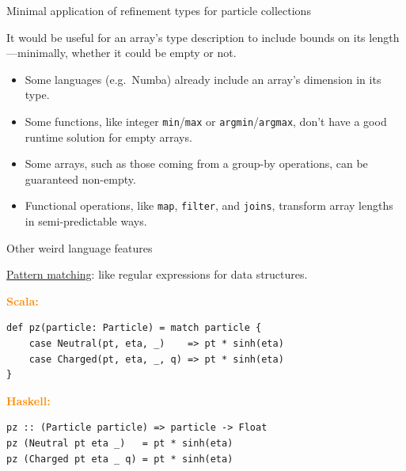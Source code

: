 \documentclass[aspectratio=169]{beamer}
\begin{document}
\begin{frame}{Minimal application of refinement types for particle collections}
\Large
\vspace{0.25 cm}
\begin{center}
It would be useful for an array's type description to include bounds on its length---minimally, whether it could be empty or not.

\large
\vspace{0.5 cm}
\begin{minipage}{0.85\linewidth}
\begin{itemize}
\item Some languages (e.g.\ Numba) already include an array's dimension in its type.
\item Some functions, like integer {\tt min}/{\tt max} or {\tt argmin}/{\tt argmax}, don't have a good runtime solution for empty arrays.
\item Some arrays, such as those coming from a group-by operations, can be guaranteed non-empty.
\item Functional operations, like {\tt map}, {\tt filter}, and {\tt joins}, transform array lengths in semi-predictable ways.
\end{itemize}
\end{minipage}
\end{center}
\end{frame}

\begin{frame}[fragile]{Other weird language features}
\Large
\vspace{0.5 cm}

\underline{Pattern matching}: like regular expressions for data structures.

\vspace{0.65 cm}
\textcolor{darkorange}{\bf Scala:}

\begin{center}
\begin{minipage}{0.85\linewidth}
\normalsize
\begin{verbatim}
def pz(particle: Particle) = match particle {
    case Neutral(pt, eta, _)    => pt * sinh(eta)
    case Charged(pt, eta, _, q) => pt * sinh(eta)
}
\end{verbatim}
\end{minipage}
\end{center}

\vspace{0.25 cm}
\textcolor{darkorange}{\bf Haskell:}

\begin{center}
\begin{minipage}{0.85\linewidth}
\normalsize
\begin{verbatim}
pz :: (Particle particle) => particle -> Float
pz (Neutral pt eta _)   = pt * sinh(eta)
pz (Charged pt eta _ q) = pt * sinh(eta)
\end{verbatim}
\end{minipage}
\end{center}
\end{frame}
\end{document}
